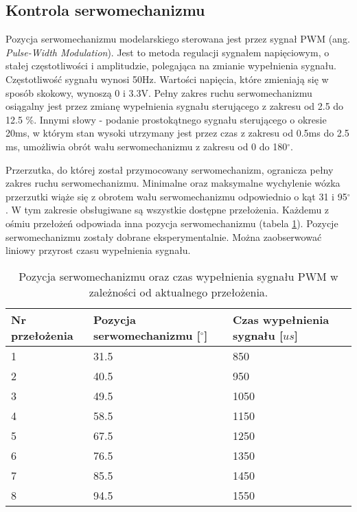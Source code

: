 \subsection{Kontrola serwomechanizmu}
Pozycja serwomechanizmu modelarskiego sterowana jest przez sygnał PWM (ang. {\em Pulse-Width Modulation}). Jest to metoda regulacji sygnałem napięciowym, o stałej częstotliwości i amplitudzie, polegająca na zmianie wypełnienia sygnału. Częstotliwość sygnału wynosi 50Hz. Wartości napięcia, które zmieniają się w sposób skokowy, wynoszą 0 i 3.3V. Pełny zakres ruchu serwomechanizmu osiągalny jest przez zmianę wypełnienia sygnału sterującego z zakresu od 2.5 do 12.5 \%. Innymi słowy - podanie prostokątnego sygnału sterującego o okresie 20ms, w którym stan wysoki utrzymany jest przez czas z zakresu od 0.5ms do 2.5 ms, umożliwia obrót wału serwomechanizmu z zakresu od 0 do 180$^{\circ}$.

Przerzutka, do której został przymocowany serwomechanizm, ogranicza pełny zakres ruchu serwomechanizmu. Minimalne oraz maksymalne wychylenie wózka przerzutki wiąże się z obrotem wału serwomechanizmu odpowiednio o kąt 31 i 95$^{\circ}$. W tym zakresie obsługiwane są wszystkie dostępne przełożenia. Każdemu z ośmiu przełożeń odpowiada inna pozycja serwomechanizmu (tabela \ref{tab:przelozenia}). Pozycje serwomechanizmu zostały dobrane eksperymentalnie. Można zaobserwować liniowy przyrost czasu wypełnienia sygnału. 
\begin{table}[h]
    \caption{Pozycja serwomechanizmu oraz czas wypełnienia sygnału PWM w zależności od aktualnego przełożenia.}
    \begin{center}
		\label{tab:przelozenia}
		\begin{tabular}{|m{2.3cm}|m{3cm}|m{3cm}|}
			\hline
 			\textbf{Nr przełożenia} & \textbf{Pozycja serwomechanizmu [$^{\circ}$]} & \textbf{Czas wypełnienia sygnału [$us$]} \\
 			\hline
 			1 & 31.5 & 850 \\ 
 			\hline 
			2 & 40.5 & 950 \\
			\hline
			3 & 49.5 & 1050 \\  
			\hline
			4 & 58.5 & 1150 \\  
			\hline
			5 & 67.5 & 1250 \\  
			\hline
			6 & 76.5 & 1350 \\  
			\hline
			7 & 85.5 & 1450 \\  
			\hline
			8 & 94.5 & 1550 \\  
			\hline
		\end{tabular}
	\end{center}
\end{table}

